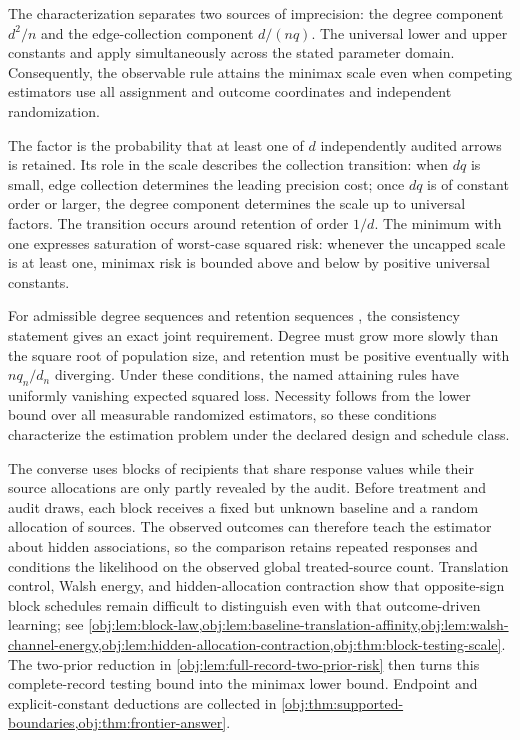 The characterization separates two sources of imprecision: the degree component \(d^2/n\) and the edge-collection component \(d/(nq)\). The universal lower and upper constants  and  apply simultaneously across the stated parameter domain. Consequently, the observable rule attains the minimax scale even when competing estimators use all assignment and outcome coordinates and independent randomization.

The factor  is the probability that at least one of \(d\) independently audited arrows is retained. Its role in the scale describes the collection transition: when \(dq\) is small, edge collection determines the leading precision cost; once \(dq\) is of constant order or larger, the degree component determines the scale up to universal factors. The transition occurs around retention of order \(1/d\). The minimum with one expresses saturation of worst-case squared risk: whenever the uncapped scale is at least one, minimax risk is bounded above and below by positive universal constants.

For admissible degree sequences  and retention sequences , the consistency statement gives an exact joint requirement. Degree must grow more slowly than the square root of population size, and retention must be positive eventually with \(nq_n/d_n\) diverging. Under these conditions, the named attaining rules have uniformly vanishing expected squared loss. Necessity follows from the lower bound over all measurable randomized estimators, so these conditions characterize the estimation problem under the declared design and schedule class.

The converse uses blocks of recipients that share response values while their source allocations are only partly revealed by the audit. Before treatment and audit draws, each block receives a fixed but unknown baseline and a random allocation of sources. The observed outcomes can therefore teach the estimator about hidden associations, so the comparison retains repeated responses and conditions the likelihood on the observed global treated-source count. Translation control, Walsh energy, and hidden-allocation contraction show that opposite-sign block schedules remain difficult to distinguish even with that outcome-driven learning; see \cref{obj:lem:block-law,obj:lem:baseline-translation-affinity,obj:lem:walsh-channel-energy,obj:lem:hidden-allocation-contraction,obj:thm:block-testing-scale}. The two-prior reduction in \cref{obj:lem:full-record-two-prior-risk} then turns this complete-record testing bound into the minimax lower bound. Endpoint and explicit-constant deductions are collected in \cref{obj:thm:supported-boundaries,obj:thm:frontier-answer}.
